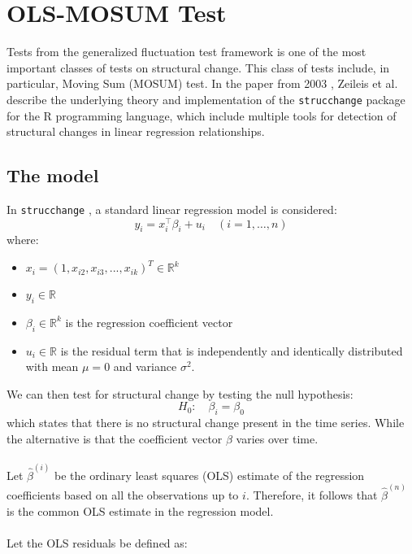 \documentclass[main.tex]{subfiles}
\begin{document}
\section{OLS-MOSUM Test}
\label{sec:mosum}

Tests from the generalized fluctuation test framework \cite{kuan_hornik}
is one of the most important classes of tests on structural change. This class
of tests include, in particular, Moving Sum (MOSUM) test. In the paper from
2003 \cite{strucchange}, Zeileis et al. describe the underlying theory and
implementation of the \texttt{strucchange}
package for the R programming language, which include multiple tools for
detection of structural changes in linear regression relationships.

\subsection{The model}
\label{sec:mosum}
In \texttt{strucchange} \cite{strucchange}, a standard linear regression model is considered:
\[
y_{i}=x_{i}^{\top} \beta_{i}+u_{i} \quad(i=1, \ldots, n)
\]
where:
\begin{itemize}
\item $x_i = (1,x_{i2}, x_{i3}, ..., x_{ik})^T \in \mathbb{R}^k$
\item $y_i \in \mathbb{R}$
\item $\beta_i \in \mathbb{R}^{k} $ is the
  regression coefficient vector
\item $u_i \in \mathbb{R}$ is the residual term that is independently and identically
  distributed with mean $\mu = 0$ and variance $\sigma^2$.
\end{itemize}
We can then test for structural change by testing the null hypothesis:
\[
H_0:\quad \beta_i = \beta_0
\]
which states that there is no structural change present in the time series.
While the alternative is that the coefficient vector $\beta$ varies over time. \\\\
Let $\hat{\beta}^{(i)}$ be the ordinary least squares (OLS) estimate of the
regression coefficients based on all the observations up to $i$.
Therefore, it follows that $\hat{\beta}^{(n)}$ is the common OLS estimate in the regression model. \\\\
Let the OLS residuals be defined as:
\end{document}
